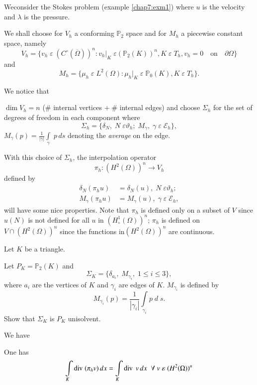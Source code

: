 We\pageoriginale consider the Stokes problem (example \ref{chap7:exm1})
where $u$ is the velocity and $\lambda$ is the pressure.

We shall choose for $V_h$ a conforming $\mathbb{P}_2$ space and for
$M_h$ a piecewise constant space, namely
$$
V_h=\{v_h\;\varepsilon\;(C^\circ(\overline{\Omega}))^n:v_h|_K\;\varepsilon
(\mathbb{P}_2(K))^n,K\;\varepsilon\;T_h,v_h=0\quad\text{on}\quad
\partial\Omega\}
$$
and
$$
M_h=\{\mu_h\;\varepsilon\;L^2(\Omega):\mu_h|_K\;\varepsilon
\;\mathbb{P}_0(K),K\;\varepsilon \;T_h\}.
$$

We notice that 

$\dim V_h=n$ (\# internal vertices $+\;\#$ internal edges) and choose
$\Sigma_h$ for the set of degrees of freedom in each component where
$$
\Sigma_h=\{\delta_N,\;N\;\varepsilon\vartheta_h;\;M_\gamma,\;\gamma
\;\varepsilon \;\mathscr{E}_h\},
$$
$M_\gamma(p)=\frac{1}{|\gamma|}\int\limits_\gamma \;p\,ds$ denoting the
\emph{average} on the edge.

With this choice of $\Sigma_h$, the interpolation operator
$$
\pi_h:(H^2(\Omega))^n\to V_h
$$
defined by 
\begin{align*}
\delta_N(\pi_hu) &= \delta_N(u),\;N\;\varepsilon\vartheta_h;\\
M_\gamma(\pi_hu) &= M_\gamma(u),\;\gamma\;\varepsilon\; \mathscr{E}_h,
\end{align*}
will have some nice properties. Note that $\pi_h$ is defined only on a
subset of $V$ since $u(N)$ is not defined for all $u$ in
$(H_\circ^1(\Omega))^n$; $\pi_h$ is defined on $V\cap(H^2(\Omega))^n$
since the functions in\pageoriginale $(H^2(\Omega))^n$ are continuous.

\begin{exercise}\label{chap7:exr3}
Let $K$ be a triangle.

Let $P_K=\mathbb{P}_2(K)$ and 
$$
\Sigma_K=\{\delta_{a_i},\;M_{\gamma_i},\;1\leq i\leq 3\},
$$
where $a_i$ are the vertices of $K$ and $\gamma_i$ are edges of
$K$. $M_{\gamma_i}$ is defined by 
$$
M_{\gamma_i}(p)=\frac{1}{|\gamma_i|}\int\limits_{\gamma_i}p\;d\;s.
$$
Show that $\Sigma_K$ is $P_K$ unisolvent. 

We have 
\end{exercise}

\setcounter{lem}{2}
\begin{lem}\label{chap7:lem3}
One has 
$$
\int\limits_K\operatorname{div}\;(\pi_hv)\,dx=\int\limits_K\operatorname{div} \;v\,dx\; \; \forall
\;v\;\varepsilon \;(H^2(\Omega))^n
$$
\end{lem}

